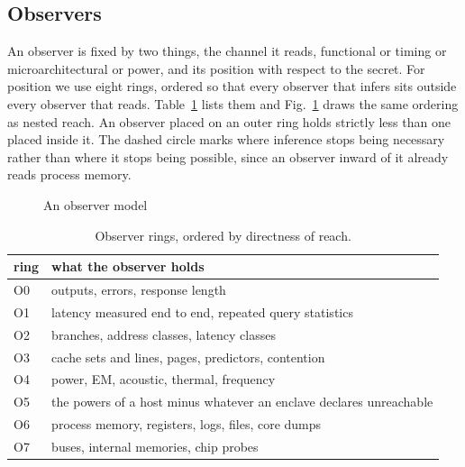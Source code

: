 \subsection{Observers}
\label{sec:threat:rings}
An observer is fixed by two things, the channel it reads, functional or timing or microarchitectural or power, and its position with respect to the secret.
For position we use eight rings, ordered so that every observer that infers sits outside every observer that reads.
Table~\ref{tab:rings} lists them and Fig.~\ref{fig:onion} draws the same ordering as nested reach. An observer placed on an outer ring holds strictly less than one placed inside it. The dashed circle marks where inference stops being necessary rather than where it stops being possible, since an observer inward of it already reads process memory.
\begin{figure}[t]
\centering
{}
\caption{An observer model}
\label{fig:onion}
\end{figure}
\begin{table}[t]
\caption{Observer rings, ordered by directness of reach.}
\label{tab:rings}
\centering
\small
\begin{tabular}{@{}l@{\hspace{1em}}p{}@{}}
\hline
ring & what the observer holds \\
\hline
O0 & outputs, errors, response length \\
O1 & latency measured end to end, repeated query statistics \\
O2 & branches, address classes, latency classes \\
O3 & cache sets and lines, pages, predictors, contention \\
O4 & power, EM, acoustic, thermal, frequency \\
O5 & the powers of a host minus whatever an enclave declares unreachable \\
O6 & process memory, registers, logs, files, core dumps \\
O7 & buses, internal memories, chip probes \\
\hline
\end{tabular}
\end{table}

